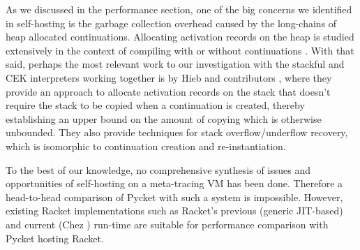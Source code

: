 As we discussed in the performance section, one of the big concerns we
identified in self-hosting is the garbage collection overhead caused
by the long-chains of heap allocated continuations. Allocating
activation records on the heap is studied extensively in the context
of compiling with \cite{comp-cont:07} or without
\cite{comp-without-cont:17} continuations \cite{whatever:19,
  compWithContLLVM:16}. With that said, perhaps the most relevant work
to our investigation with the stackful and CEK interpreters working
together is by Hieb and contributors \cite{cont-heap-stack:90}, where
they provide an approach to allocate activation records on the stack
that doesn't require the stack to be copied when a continuation is
created, thereby establishing an upper bound on the amount of copying
which is otherwise unbounded. They also provide techniques for stack
overflow/underflow recovery, which is isomorphic to continuation
creation and re-instantiation.

To the best of our knowledge, no comprehensive synthesis of issues and
opportunities of self-hosting on a meta-tracing VM has been
done. Therefore a head-to-head comparison of Pycket with such a system
is impossible. However, existing Racket implementations such as
Racket's previous (generic JIT-based) and current (Chez
\cite{racket-on-chez-19}) run-time are suitable for performance
comparison with Pycket hosting Racket.



